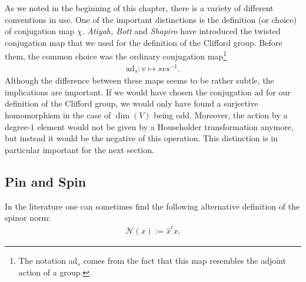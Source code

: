    \begin{remark}
        As we noted in the beginning of this chapter, there is a variety of different conventions in use. One of the important distinctions is the definition (or choice) of conjugation map $\chi$. \textit{Atiyah, Bott} and \textit{Shapiro} have introduced the twisted conjugation map that we used for the definition of the Clifford group. Before them, the common choice was the ordinary conjugation map\footnote{The notation ad$_s$ comes from the fact that this map resembles the adjoint action of a group.}
        \begin{gather}
            \text{ad}_s:v\mapsto svs^{-1}.
        \end{gather}
        Although the difference between these maps seems to be rather subtle, the implications are important. If we would have chosen the conjugation $\text{ad}$ for our definition of the Clifford group, we would only have found a surjective homomorphism in the case of $\dim(V)$ being odd. Moreover, the action by a degree-1 element would not be given by a Householder transformation anymore, but instead it would be the negative of this operation. This distinction is in particular important for the next section.
    \end{remark}

\subsection{Pin and Spin}\label{clifford:section:spin}

    \begin{remark}
        In the literature one can sometimes find the following alternative definition of the spinor norm:
        \begin{gather}
            \mathcal{N}(x) := \hat{x}^tx.
        \end{gather}
    \end{remark}

